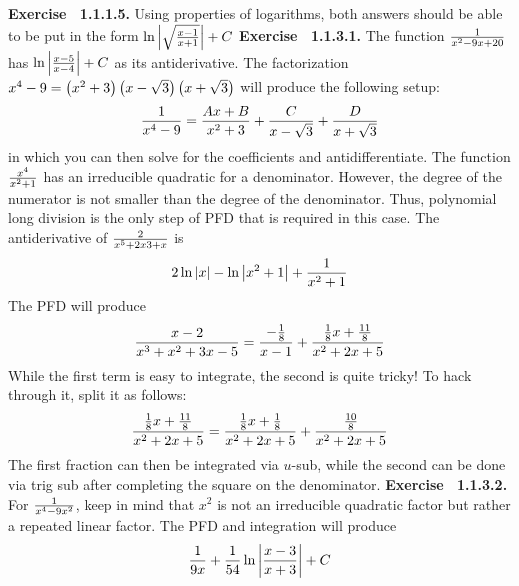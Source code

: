 \par 
 {\noindent \protect \bf  Exercise ~1.1.1.5.} Using properties of logarithms, both answers should be able to be put in the form $\protect \qopname  \relax o{ln}\left | \protect \sqrt  {\protect \frac  {x-1}{x+1}}\right |+C$ \protect \newline  \protect \newline  
 {\noindent \protect \bf  Exercise ~1.1.3.1.} \textbullet The function $\protect \frac  {1}{x^2-9x+20}$ has $\protect \qopname  \relax o{ln}\left |\protect \frac  {x-5}{x-4}\right |+C$ as its antiderivative. \textbullet The factorization $x^4-9=\left (x^2+3\right )\left (x-\protect \sqrt  {3}\right )\left (x+\protect \sqrt  {3}\right )$ will produce the following setup: $$\protect \frac  {1}{x^4-9}=\protect \frac  {Ax+B}{x^2+3}+\protect \frac  {C}{x-\protect \sqrt  {3}}+\protect \frac  {D}{x+\protect \sqrt  {3}} $$ in which you can then solve for the coefficients and antidifferentiate. \textbullet The function $\protect \frac  {x^4}{x^2+1}$ has an irreducible quadratic for a denominator. However, the degree of the numerator is not smaller than the degree of the denominator. Thus, polynomial long division is the only step of PFD that is required in this case. \textbullet The antiderivative of $\protect \frac  {2}{x^5+2x3+x}$ is $$2\protect \qopname  \relax o{ln}|x|-\protect \qopname  \relax o{ln}\left | x^2+1\right |+\protect \frac  {1}{x^2+1}$$ \textbullet The PFD will produce $$ \protect \frac  {x-2}{x^3+x^2+3x-5}=\protect \frac  {-\protect \frac  {1}{8}}{x-1}+\protect \frac  {\protect \frac  {1}{8}x+\protect \frac  {11}{8}}{x^2+2x+5}$$ While the first term is easy to integrate, the second is quite tricky! To hack through it, split it as follows: $$\protect \frac  {\protect \frac  {1}{8}x+\protect \frac  {11}{8}}{x^2+2x+5}=\protect \frac  {\protect \frac  {1}{8}x+\protect \frac  {1}{8}}{x^2+2x+5}+\protect \frac  {\protect \frac  {10}{8}}{x^2+2x+5} $$ The first fraction can then be integrated via $u$-sub, while the second can be done via trig sub after completing the square on the denominator. \protect \newline  \protect \newline  
 {\noindent \protect \bf  Exercise ~1.1.3.2.} For $\protect \frac  {1}{x^4-9x^2}$, keep in mind that $x^2$ is not an irreducible quadratic factor but rather a repeated linear factor. The PFD and integration will produce $$\protect \frac  {1}{9x}+\protect \frac  {1}{54}\protect \qopname  \relax o{ln}\left |\protect \frac  {x-3}{x+3}\right |+C $$  \protect \newline  \protect \newline  
